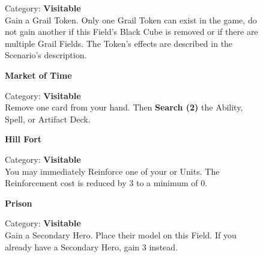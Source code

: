 \begin{figure}[H]
  \begin{minipage}[t]{0.47\textwidth}
    \vspace{0pt}
    \centering
    \phantom{j}\textbf{}\par
    \caption{\small Category: \textbf{Visitable}\\Gain a Grail Token.
    Only one Grail Token can exist in the game, do not gain another if this Field's Black Cube is removed or if there are multiple Grail Fields.
    The Token's effects are described in the Scenario's description.
    \phantom{\ldots\ldots\ldots}}
  \end{minipage}\hfill
  \begin{minipage}[t]{0.47\textwidth}
    \vspace{0pt}
    \centering
    \phantom{j}\textbf{Market of Time}\par
    \caption{\small Category: \textbf{Visitable}\\ Remove one card from your hand.
      Then \textbf{Search (2)} the Ability, Spell, or Artifact Deck.
    }
  \end{minipage}
\end{figure}

\begin{figure}[H]
  \begin{minipage}[t]{0.47\textwidth}
    \vspace{0pt}
    \centering
    \phantom{j}\textbf{Hill Fort}\par
    \caption{\small Category: \textbf{Visitable}\\
      You may immediately Reinforce one of your  or  Units.
      The Reinforcement cost is reduced by 3  to a minimum of 0.}
  \end{minipage}\hfill
  \begin{minipage}[t]{0.47\textwidth}
    \vspace{0pt}
    \centering
    \phantom{j}\textbf{Prison}\par
    \caption{\small Category: \textbf{Visitable}\\
      Gain a Secondary Hero.
      Place their model on this Field.
      If you already have a Secondary Hero, gain 3  instead.}
  \end{minipage}
\end{figure}

